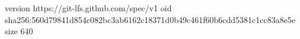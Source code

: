 version https://git-lfs.github.com/spec/v1
oid sha256:560d79841d854c082bc3ab6162c18371d0b49c461f60b6cdd5381c1cc83a8e5e
size 640

